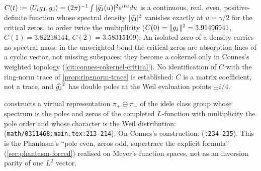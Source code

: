 \begin{proposition}
\label{prop:theta-spectral-density}
$C(t) := \langle U_tg_{\mathrm J},g_{\mathrm J}\rangle = (2\pi)^{-1}\int|\widehat{g_{\mathrm J}}(u)|^2e^{it u}du$ is a continuous,
real, even, positive-definite function whose spectral density $|\widehat{g_{\mathrm J}}|^2$ vanishes exactly at $u = \gamma/2$
for the critical zeros, to order twice the multiplicity ($C(0) = \|g_{\mathrm J}\|^2 = 3.91496941$, $C(1) = 3.82218144$,
$C(2) = 3.58315109$). An isolated zero of a density carries no spectral mass: in the unweighted bond the critical
zeros are absorption lines of a cyclic vector, not missing subspaces; they become a cokernel only in Connes's
weighted topology (\cref{cit:connes-cokernel-critical}). No identification of $C$ with the ring-norm trace of
\cref{prop:ringnorm-trace} is established: $C$ is a matrix coefficient, not a trace, and $\widehat{g_{\mathrm J}}^2$ has double
poles at the Weil evaluation points $\pm i/4$.
\end{proposition}

\begin{citedfact}
\label{cit:meyer-virtual-representation}
\cite{meyer2005idele} constructs a virtual representation $\pi_+\ominus\pi_-$ of the idele class group whose spectrum
is the poles and zeros of the completed $L$-function with multiplicity the pole order and whose character is the
Weil distribution: \texttt{}
(\texttt{math/0311468:main.tex:213-214}). On Connes's construction: \texttt{}
(\texttt{:234-235}). This is the Phantasm's ``pole even, zeros odd, supertrace the explicit formula''
(\cref{sec:phantasm-forced}) realised on Meyer's function spaces, not as an inversion parity of one $L^2$ vector.
\end{citedfact}
